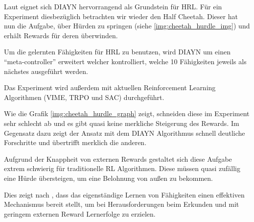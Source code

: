 Laut \cite{diversity_eysenbach} eignet sich DIAYN hervorrangend als Grundstein für HRL. Für ein Experiment diesbezüglich betrachten wir wieder den Half Cheetah. Dieser hat nun die Aufgabe, über Hürden zu springen (siehe \ref{img:cheetah_hurdle_img}) und erhält Rewards für deren überwinden.

Um die gelernten Fähigkeiten für HRL zu benutzen, wird DIAYN um einen ``meta-controller'' erweitert welcher kontrolliert, welche 10 Fähigkeiten jeweils als nächstes ausgeführt werden.

Das Experiment wird außerdem mit aktuellen Reinforcement Learning Algorithmen (VIME, TRPO und SAC) durchgeführt.

Wie die Grafik \ref{img:cheetah_hurdle_graph} zeigt, schneiden diese im Experiment sehr schlecht ab und es gibt quasi keine merkliche Steigerung des Rewards. Im Gegensatz dazu zeigt der Ansatz mit dem DIAYN Algorithmus schnell deutliche Forschritte und übertrifft merklich die anderen.

Aufgrund der Knappheit von externen Rewards gestaltet sich diese Aufgabe extrem schwierig für traditionelle RL Algorithmen. Diese müssen quasi zufällig eine Hürde übersteigen, um eine Belohnung von außen zu bekommen.

Dies zeigt nach \cite{diversity_eysenbach}, dass das eigenständige Lernen von Fähigkeiten einen effektiven Mechanismus bereit stellt, um bei Herausforderungen beim Erkunden und mit geringem externen Reward Lernerfolge zu erzielen.
